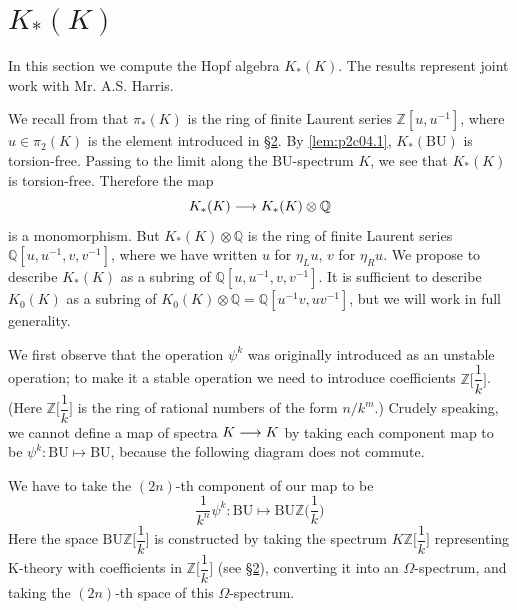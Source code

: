 \documentclass[../main]{subfiles}
\begin{document}

\chapter{\texorpdfstring{$K_\ast(K)$}{KK}}
\label{sec:p2c13} %

In this section we compute the Hopf algebra $K_\ast(K)$. The results represent joint work with Mr. A.S. Harris.

We recall from \cite{atiyahbott} that $\pi_\ast(K)$ is the ring of finite Laurent series $\mathbb{Z}[u, u^{-1}]$, where $u\in\pi_2(K)$ is the element introduced in \hyperref[sec:p2c2]{\S 2}. By \eqref{lem:p2c04.1}, $K_\ast(\mathrm{BU})$ is torsion-free. Passing to the limit along the $\mathrm{BU}$-spectrum $K$, we see that $K_\ast(K)$ is torsion-free. Therefore the map \[K_\ast(K)\longrightarrow K_\ast(K)\otimes \mathbb{Q}\] is a monomorphism. But $K_\ast(K)\otimes \mathbb{Q}$ is the ring of finite Laurent series $\mathbb{Q}[u,u^{-1},v,v^{-1}]$, where we have written $u$ for $\eta_L u$, $v$ for $\eta_R u$. We propose to describe $K_\ast(K)$ as a subring of $\mathbb{Q}[u,u^{-1},v,v^{-1}]$. It is sufficient to describe $K_0(K)$ as a subring of $K_0(K)\otimes\mathbb{Q}=\mathbb{Q}[u^{-1}v,uv^{-1}]$, but we will work in full generality. 

We first observe that the operation $\psi^k$ was originally introduced as an unstable operation; to make it a stable operation we need to introduce coefficients $\mathbb{Z}\Big[\dfrac{1}{k}\Big]$. (Here $\mathbb{Z}\Big[\dfrac{1}{k}\Big]$ is the ring of rational numbers of the form $n/k^m$.) Crudely speaking, we cannot define a map of spectra $K\longrightarrow K$ by taking each component map to be $\psi^k: \mathrm{BU}\mapsto \mathrm{BU}$, because the following diagram does not commute.
\begin{center}
\end{center}
We have to take the $(2n)$-th component of our map to be \[\dfrac{1}{k^n}\psi^k:\mathrm{BU}\mapsto \mathrm{BU}\mathbb{Z}\Big(\dfrac{1}{k}\Big)\]
Here the space $\mathrm{BU}\mathbb{Z}\Big[\dfrac{1}{k}\Big]$ is constructed by taking the spectrum $K\mathbb{Z}\Big[\dfrac{1}{k}\Big]$ representing K-theory with coefficients in $\mathbb{Z}\Big[\dfrac{1}{k}\Big]$ (see \hyperref[sec:p2c2]{\S2}), converting it into an $\Omega$-spectrum, and taking the $(2n)$-th space of this $\Omega$-spectrum.
\end{document}
